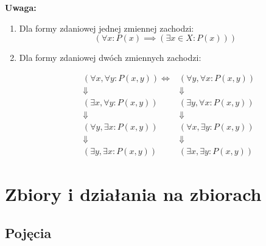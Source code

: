 \documentclass[a5paper,8pt]{article}
\theoremstyle{mythmstyle}
\begin{document}
            \pagebreak
            {\large{\textbf{Uwaga:}}}
            \begin{enumerate}
                \item Dla formy zdaniowej jednej zmiennej zachodzi:
                \begin{equation*}
                    (\forall x : P(x) \implies (\exists x \in X : P(x)))
                \end{equation*}

                \item Dla formy zdaniowej dwóch zmiennych zachodzi:

                \begin{equation*}
                    \begin{aligned}
                        &( \forall x, \forall y : P(x, y) ) \iff &( \forall y, \forall x : P(x,y)) \\
                        & \Downarrow & \Downarrow \\
                        &( \exists x, \forall y : P(x, y) ) & ( \exists y, \forall x : P(x,y)) \\
                        & \Downarrow & \Downarrow \\
                        &( \forall y, \exists x : P(x, y) ) & ( \forall x, \exists y : P(x,y)) \\
                        & \Downarrow & \Downarrow \\
                        &( \exists y, \exists x : P(x, y) ) & ( \exists x, \exists y : P(x,y))
                    \end{aligned}
                \end{equation*}

            \end{enumerate}



    \section{Zbiory i działania na zbiorach} %
    \label{sec:zbiory_i_dzialania_na_zbiorach}

    \subsection{Pojęcia} %
    \label{sub:pojęcia}
    
\end{document}
